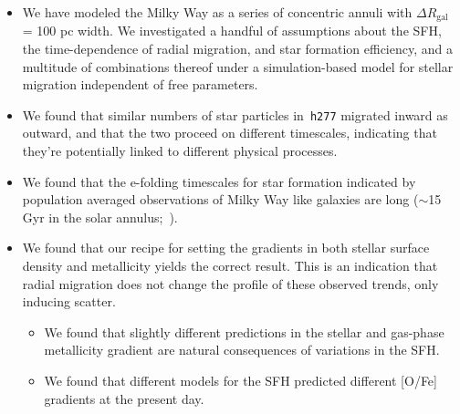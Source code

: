 \documentclass[a4paper, fleqn, usenatbib, useAMS]{mnras}
\begin{document}
\begin{itemize} 
	\item We have modeled the Milky Way as a series of concentric annuli with 
	$\Delta R_\text{gal}$ = 100 pc width. We investigated a handful of 
	assumptions about the SFH, the time-dependence of radial migration, and 
	star formation efficiency, and a multitude of combinations thereof under 
	a simulation-based model for stellar migration independent of free 
	parameters. 

	\item We found that similar numbers of star particles in~\texttt{h277} 
	migrated inward as outward, and that the two proceed on different 
	timescales, indicating that they're potentially linked to different 
	physical processes. 

	\item We found that the e-folding timescales for star formation indicated 
	by population averaged observations of Milky Way like galaxies are long 
	($\sim$15 Gyr in the solar annulus;~\citealp{Sanchez2020}). 

	\item We found that our recipe for setting the gradients in both stellar 
	surface density and metallicity yields the correct result. This is an 
	indication that radial migration does not change the profile of these 
	observed trends, only inducing scatter. 
	\begin{itemize} 
		\item We found that slightly different predictions in the stellar 
		and gas-phase metallicity gradient are natural consequences of 
		variations in the SFH. 

		\item We found that different models for the SFH predicted different 
		[O/Fe] gradients at the present day. 
	\end{itemize} 


\end{itemize}
\end{document}
